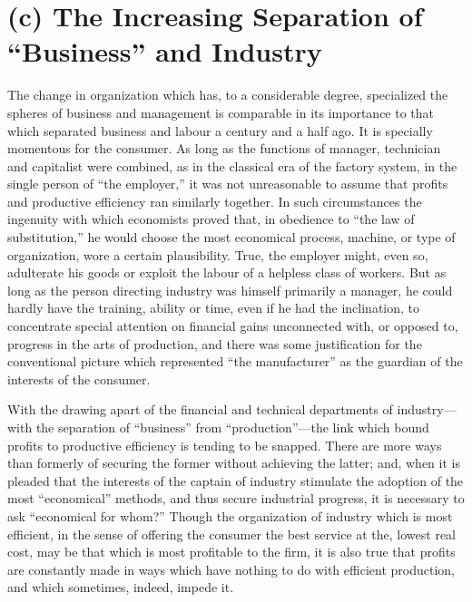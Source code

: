 \documentclass{book}
\begin{document}
\section{(c) The Increasing Separation of “Business” and Industry}
The change in organization which has, to a considerable degree, specialized the spheres of business and management is comparable in its importance to that which separated business and labour a century and a half ago. It is specially momentous for the consumer. As long as the functions of manager, technician and capitalist were combined, as in the classical era of the factory system, in the single person of “the employer,” it was not unreasonable to assume that profits and productive efficiency ran similarly together. In such circumstances the ingenuity with which economists proved that, in obedience to “the law of substitution,” he would choose the most economical process, machine, or type of organization, wore a certain plausibility. True, the employer might, even so, adulterate his goods or exploit the labour of a helpless class of workers. But as long as the person directing industry was himself primarily a manager, he could hardly have the training, ability or time, even if he had the inclination, to concentrate special attention on financial gains unconnected with, or opposed to, progress in the arts of production, and there was some justification for the conventional picture which represented “the manufacturer” as the guardian of the interests of the consumer.

With the drawing apart of the financial and technical departments of industry—with the separation of “business” from “production”—the link which bound profits to productive efficiency is tending to be snapped. There are more ways than formerly of securing the former without achieving the latter; and, when it is pleaded that the interests of the captain of industry stimulate the adoption of the most “economical” methods, and thus secure industrial progress, it is necessary to ask “economical for whom?” Though the organization of industry which is most efficient, in the sense of offering the consumer the best service at the, lowest real cost, may be that which is most profitable to the firm, it is also true that profits are constantly made in ways which have nothing to do with efficient production, and which sometimes, indeed, impede it.
\end{document}
